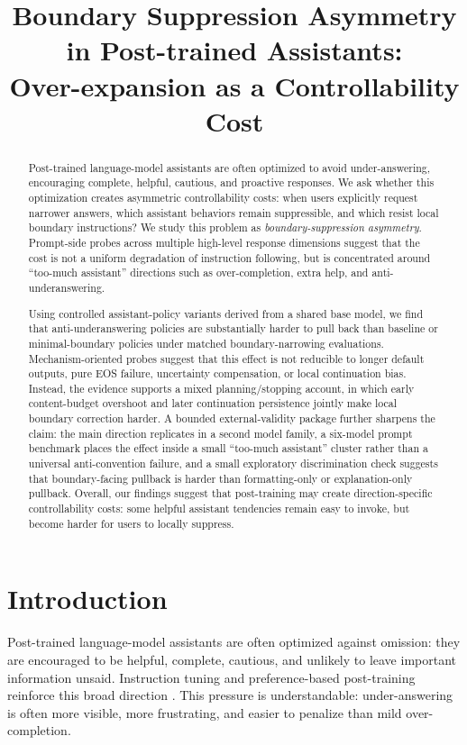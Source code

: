 \documentclass[11pt]{article}
\title{Boundary Suppression Asymmetry in Post-trained Assistants:\\
Over-expansion as a Controllability Cost}
\author{}
\begin{document}
\maketitle


\begin{abstract}
Post-trained language-model assistants are often optimized to avoid under-answering, encouraging complete, helpful, cautious, and proactive responses. We ask whether this optimization creates asymmetric controllability costs: when users explicitly request narrower answers, which assistant behaviors remain suppressible, and which resist local boundary instructions? We study this problem as \emph{boundary-suppression asymmetry}. Prompt-side probes across multiple high-level response dimensions suggest that the cost is not a uniform degradation of instruction following, but is concentrated around ``too-much assistant'' directions such as over-completion, extra help, and anti-underanswering.

Using controlled assistant-policy variants derived from a shared base model, we find that anti-underanswering policies are substantially harder to pull back than baseline or minimal-boundary policies under matched boundary-narrowing evaluations. Mechanism-oriented probes suggest that this effect is not reducible to longer default outputs, pure EOS failure, uncertainty compensation, or local continuation bias. Instead, the evidence supports a mixed planning/stopping account, in which early content-budget overshoot and later continuation persistence jointly make local boundary correction harder. A bounded external-validity package further sharpens the claim: the main direction replicates in a second model family, a six-model prompt benchmark places the effect inside a small ``too-much assistant'' cluster rather than a universal anti-convention failure, and a small exploratory discrimination check suggests that boundary-facing pullback is harder than formatting-only or explanation-only pullback. Overall, our findings suggest that post-training may create direction-specific controllability costs: some helpful assistant tendencies remain easy to invoke, but become harder for users to locally suppress.
\end{abstract}

\section{Introduction}

Post-trained language-model assistants are often optimized against omission: they are encouraged to be helpful, complete, cautious, and unlikely to leave important information unsaid. Instruction tuning and preference-based post-training reinforce this broad direction \citep{wei2021flan,sanh2021t0,ouyang2022instructgpt,bai2022hh,rafailov2023dpo}. This pressure is understandable: under-answering is often more visible, more frustrating, and easier to penalize than mild over-completion.
\end{document}
